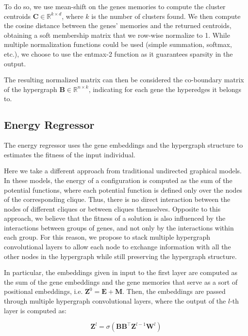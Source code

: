 To do so, we use mean-shift on the genes memories to compute the cluster centroids $\mathbf{C} \in \mathbb{R}^{k \times d}$, where $k$ is the number of clusters found. We then compute the cosine distance between the genes' memories and the returned centroids, obtaining a soft membership matrix that we row-wise normalize to 1. While multiple normalization functions could be used (simple summation, softmax, etc.), we choose to use the entmax-2 function \cite{martins_sparsemax_2016} as it guarantees sparsity in the output.

The resulting normalized matrix can then be considered the co-boundary matrix of the hypergraph $\mathbf{B} \in \mathbb{R}^{n \times k}$, indicating for each gene the hyperedges it belongs to.

\subsection*{Energy Regressor}

The energy regressor uses the gene embeddings and the hypergraph structure to estimates the fitness of the input individual.

Here we take a different approach from traditional undirected graphical models. In these models, the energy of a configuration is computed as the sum of the potential functions, where each potential function is defined only over the nodes of the corresponding clique. Thus, there is no direct interaction between the nodes of different cliques or between cliques themselves. Opposite to this approach, we believe that the fitness of a solution is also influenced by the interactions between groups of genes, and not only by the interactions within each group. For this reason, we propose to stack multiple hypergraph convolutional layers \cite{bai_hypergraph_2019} to allow each node to exchange information with all the other nodes in the hypergraph while still preserving the hypergraph structure.

In particular, the embeddings given in input to the first layer are computed as the sum of the gene embeddings and the gene memories that serve as a sort of positional embeddings, i.e. $\mathbf{Z}^0 = \mathbf{E} + \mathbf{M}$. Then, the embeddings are passed through multiple hypergraph convolutional layers, where the output of the $l$-th layer is computed as:

\begin{equation*}
    \mathbf{Z}^{l} = \sigma(\mathbf{B}\mathbf{B}^\intercal \mathbf{Z}^{l-1} \mathbf{W}^{l})
\end{equation*}


